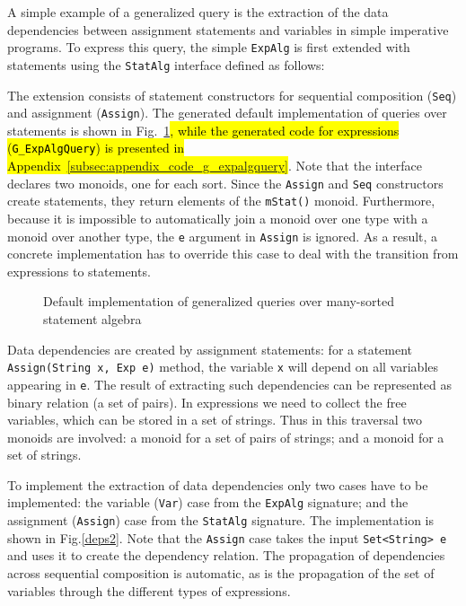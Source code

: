 A simple example of a generalized query is the extraction of the data
dependencies between assignment statements and variables in simple
imperative programs.  To express this query, the simple
\lstinline{ExpAlg} is first extended with statements using the
\lstinline{StatAlg} interface defined as follows:


The extension consists of statement constructors for sequential composition
(\lstinline{Seq}) and assignment (\lstinline{Assign}).  The generated
default implementation of queries over statements is shown in
Fig.~\ref{LST:gstatquery}\hl{, while the generated code for expressions (\lstinline{G_ExpAlgQuery}) is
presented in Appendix~\ref{subsec:appendix_code_g_expalgquery}}.  Note that the interface declares two
monoids, one for each sort.  Since the \lstinline{Assign} and
\lstinline{Seq} constructors create statements, they return elements
of the \lstinline{mStat()} monoid.  Furthermore, because it is
impossible to automatically join a monoid over one type with a monoid
over another type, the \lstinline{e} argument in \lstinline{Assign}
is ignored.  As a result, a
concrete implementation has to override this case to deal with the
transition from expressions to statements.

\begin{figure}[t]
\nocaptionrule
\caption{Default implementation of generalized queries over many-sorted statement algebra}
\label{LST:gstatquery}
\end{figure}



Data dependencies are created by assignment statements: for a
statement \lstinline{Assign(String x, Exp e)} method, the variable
\lstinline{x} will depend on all variables appearing in \lstinline{e}.
The result of extracting such dependencies can be represented as
binary relation (a set of pairs). In expressions we need to collect
the free variables, which can be stored in a set of strings.  Thus in
this traversal two monoids are involved: a monoid for a set of pairs
of strings; and a monoid for a set of strings.

To implement the extraction of data dependencies only two cases have to
be implemented: the variable (\lstinline{Var}) case from the
\lstinline{ExpAlg} signature; and the assignment (\lstinline{Assign})
case from the \lstinline{StatAlg} signature.  The implementation is
shown in Fig.\ref{deps2}.  Note that the \lstinline{Assign} case takes
the input \lstinline{Set<String> e} and uses it to create the
dependency relation.  The propagation of dependencies across
sequential composition is automatic, as is the propagation of the set
of variables through the different types of expressions.


